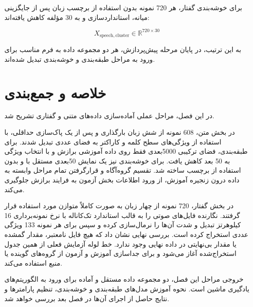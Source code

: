 برای خوشه‌بندی گفتار، هر 720 نمونه بدون استفاده از برچسب زبان پس از جایگزینی میانه، استانداردسازی و
به 30 مؤلفه کاهش یافته‌اند:

\begin{equation}
X_{\mathrm{speech,cluster}}
\in
\mathbb{R}^{720\times30}
\end{equation}

به این ترتیب، در پایان مرحله پیش‌پردازش، هر دو مجموعه داده به فرم مناسب برای ورود به مراحل طبقه‌بندی و خوشه‌بندی تبدیل شده‌اند.


\section{خلاصه و جمع‌بندی}

در این فصل، مراحل عملی آماده‌سازی داده‌های متنی و گفتاری تشریح شد.

در بخش متن، 608 نمونه از شش زبان بارگذاری و پس از یک پاک‌سازی حداقلی، با استفاده از ویژگی‌های سطح کلمه و کاراکتر به فضای عددی تبدیل شدند. برای طبقه‌بندی، فضای ترکیبی 5000بعدی فقط روی داده آموزشی برازش و با انتخاب ویژگی به 50 بعد کاهش یافت. برای خوشه‌بندی نیز یک نمایش 50بعدی مستقل با
و بدون استفاده از برچسب ساخته شد. تقسیم گروه‌آگاه و قرارگرفتن تمام مراحل وابسته به داده درون زنجیره آموزش، از ورود اطلاعات بخش آزمون به فرایند برازش جلوگیری می‌کند.

در بخش گفتار، 720 نمونه از چهار زبان به صورت کاملاً متوازن مورد استفاده قرار گرفتند. نگارنده فایل‌های صوتی را به قالب استاندارد تک‌کاناله با نرخ نمونه‌برداری 16 کیلوهرتز تبدیل و شدت آن‌ها را نرمال‌سازی کرده و سپس برای هر نمونه 133 ویژگی عددی استخراج کرده است. بررسی نهایی نشان داد که هیچ فایل نامعتبر، مقدار گمشده یا مقدار بی‌نهایتی در داده نهایی وجود ندارد. خط لوله آزمایش فعلی از همین جدول استخراج‌شده آغاز می‌شود و برای جداسازی آموزش و آزمون از گروه‌های گوینده یا منبع استفاده می‌کند.

خروجی مراحل این فصل، دو مجموعه داده مستقل و آماده برای ورود به الگوریتم‌های یادگیری ماشین است. نحوه آموزش مدل‌های طبقه‌بندی و خوشه‌بندی، تنظیم پارامترها و نتایج حاصل از اجرای آن‌ها در فصل بعد بررسی خواهد شد.
